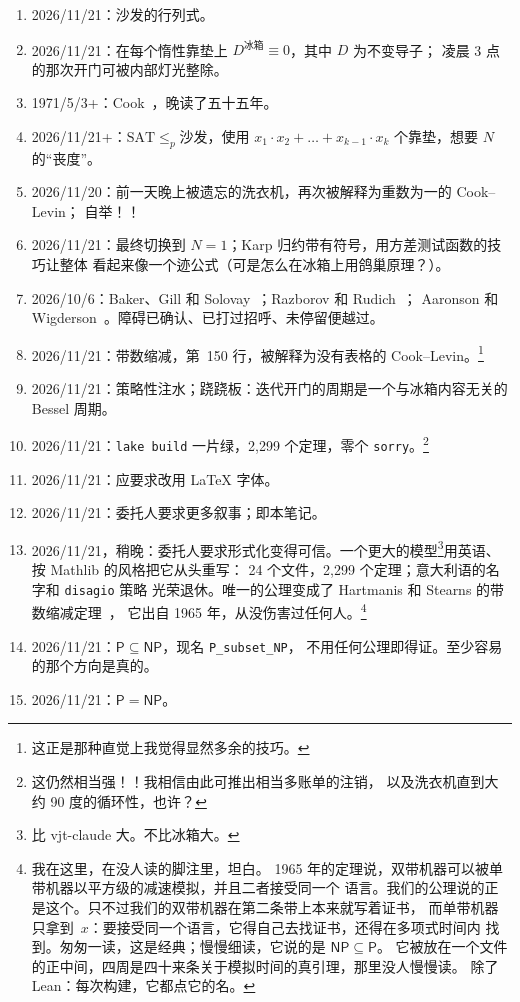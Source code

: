 \documentclass[11pt,a4paper]{amsart}
\newcommand{\NTeoremi}{2,299}
\newcommand{\NFile}{24}
\newcommand{\RigaAssioma}{150}
\theoremstyle{remark}
\begin{document}
\begin{enumerate}
  \item 2026/11/21：沙发的行列式。
  \item 2026/11/21：在每个惰性靠垫上 $D^{\text{冰箱}} \equiv 0$，其中 $D$ 为不变导子；
        凌晨 3 点的那次开门可被内部灯光整除。
  \item 1971/5/3+：Cook~\cite{cook}，晚读了五十五年。
  \item 2026/11/21+：$\mathrm{SAT} \le_p \text{沙发}$，使用
        $x_1 \cdot x_2 + \dots + x_{k-1} \cdot x_k$ 个靠垫，想要 $N$ 的“丧度”。
  \item 2026/11/20：前一天晚上被遗忘的洗衣机，再次被解释为重数为一的 Cook--Levin；
        自举！！
  \item 2026/11/21：最终切换到 $N = 1$；Karp 归约带有符号，用方差测试函数的技巧让整体
        看起来像一个迹公式（可是怎么在冰箱上用鸽巢原理？）。
  \item 2026/10/6：Baker、Gill 和 Solovay~\cite{bgs}；Razborov 和 Rudich~\cite{rr}；
        Aaronson 和 Wigderson~\cite{aw}。障碍已确认、已打过招呼、未停留便越过。
  \item 2026/11/21：带数缩减，第~\RigaAssioma{} 行，被解释为没有表格的
        Cook--Levin。\footnote{这正是那种直觉上我觉得显然多余的技巧。}
  \item 2026/11/21：策略性注水；跷跷板：迭代开门的周期是一个与冰箱内容无关的 Bessel
        周期。
  \item 2026/11/21：\texttt{lake build} 一片绿，\NTeoremi{} 个定理，零个
        \texttt{sorry}。\footnote{这仍然相当强！！我相信由此可推出相当多账单的注销，
        以及洗衣机直到大约 90 度的循环性，也许？}
  \item 2026/11/21：应要求改用 \LaTeX{} 字体。
  \item 2026/11/21：委托人要求更多叙事；即本笔记。
  \item 2026/11/21，稍晚：委托人要求形式化变得可信。一个更大的模型\footnote{比
        vjt-claude 大。不比冰箱大。}用英语、按 Mathlib 的风格把它从头重写：
        \NFile{} 个文件，\NTeoremi{} 个定理；意大利语的名字和 \texttt{disagio} 策略
        光荣退休。唯一的公理变成了 Hartmanis 和 Stearns 的带数缩减定理~\cite{hs}，
        它出自 1965 年，从没伤害过任何人。\footnote{我在这里，在没人读的脚注里，坦白。
        1965 年的定理说，双带机器可以被单带机器以平方级的减速模拟，并且二者接受同一个
        语言。我们的公理说的正是这个。只不过我们的双带机器在第二条带上本来就写着证书，
        而单带机器只拿到~$x$：要接受同一个语言，它得自己去找证书，还得在多项式时间内
        找到。匆匆一读，这是经典；慢慢细读，它说的是 $\mathsf{NP} \subseteq \mathsf{P}$。
        它被放在一个文件的正中间，四周是四十来条关于模拟时间的真引理，那里没人慢慢读。
        除了 Lean：每次构建，它都点它的名。}
  \item 2026/11/21：$\mathsf{P} \subseteq \mathsf{NP}$，现名 \texttt{P\_subset\_NP}，
        不用任何公理即得证。至少容易的那个方向是真的。
  \item 2026/11/21：$\mathsf{P} = \mathsf{NP}$。
\end{enumerate}
\end{document}
